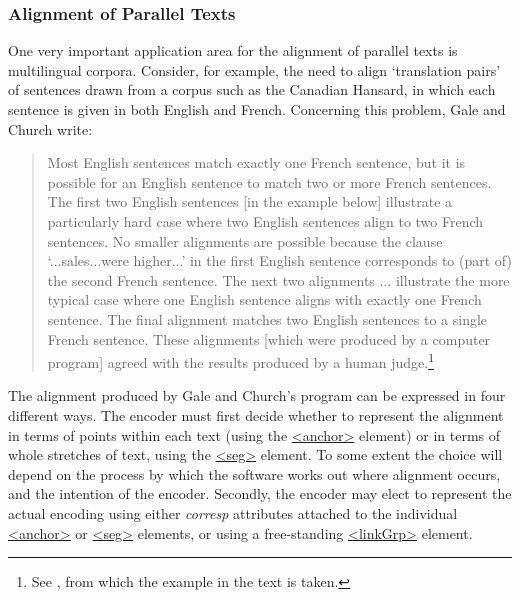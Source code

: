 \subsubsection[{Alignment of Parallel Texts}]{Alignment of Parallel Texts}\label{SACSAL}\par
One very important application area for the alignment of parallel texts is multilingual corpora. Consider, for example, the need to align ‘translation pairs’ of sentences drawn from a corpus such as the Canadian Hansard, in which each sentence is given in both English and French. Concerning this problem, Gale and Church write: 
\begin{quote}Most English sentences match exactly one French sentence, but it is possible for an English sentence to match two or more French sentences. The first two English sentences [in the example below] illustrate a particularly hard case where two English sentences align to two French sentences. No smaller alignments are possible because the clause ‘...sales...were higher...’ in the first English sentence corresponds to (part of) the second French sentence. The next two alignments ... illustrate the more typical case where one English sentence aligns with exactly one French sentence. The final alignment matches two English sentences to a single French sentence. These alignments [which were produced by a computer program] agreed with the results produced by a human judge.\footnote{See \cite{SA-BIBL-1}, from which the example in the text is taken.}\end{quote}
\par
The alignment produced by Gale and Church's program can be expressed in four different ways. The encoder must first decide whether to represent the alignment in terms of points within each text (using the \hyperref[TEI.anchor]{<anchor>} element) or in terms of whole stretches of text, using the \hyperref[TEI.seg]{<seg>} element. To some extent the choice will depend on the process by which the software works out where alignment occurs, and the intention of the encoder. Secondly, the encoder may elect to represent the actual encoding using either {\itshape corresp} attributes attached to the individual \hyperref[TEI.anchor]{<anchor>} or \hyperref[TEI.seg]{<seg>} elements, or using a free-standing \hyperref[TEI.linkGrp]{<linkGrp>} element.\par

